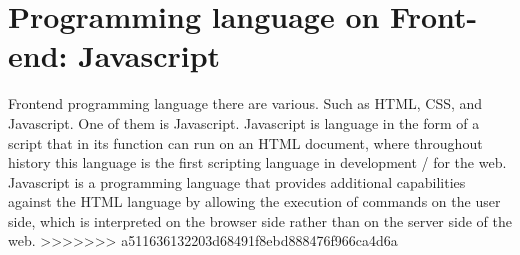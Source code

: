 \section{Programming language on Front-end: Javascript }
Frontend programming language there are various. Such as HTML, CSS, and Javascript. One of them is Javascript. Javascript is language in the form of a script that in its function can run on an HTML document, where throughout history this language is the first scripting language in development / for the web. Javascript is a programming language that provides additional capabilities against the HTML language by allowing the execution of commands on the user side, which is interpreted on the browser side rather than on the server side of the web.
>>>>>>> a511636132203d68491f8ebd888476f966ca4d6a
